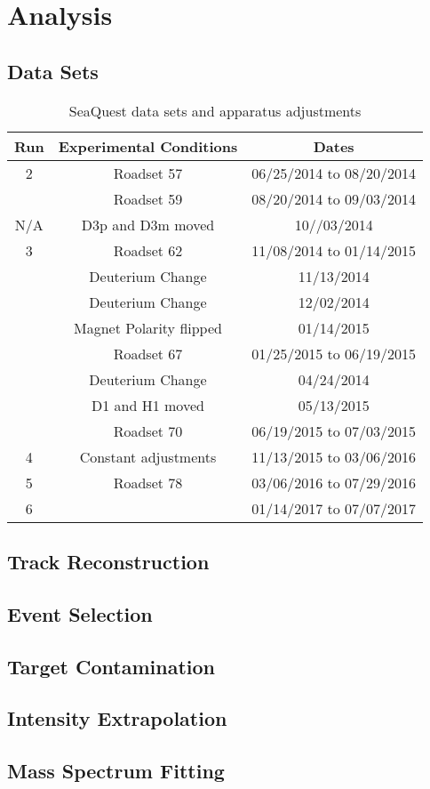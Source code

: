 \documentclass[../main.tex]{subfiles}
\begin{document}
\ifSubfilesClassLoaded{\mainmatter}{}

\chapter{Analysis}
\label{ch:analysis}

\section{Data Sets}

\begin{table}[h!]
	\centering
	\begin{tabular}{ c c c }
		\hline
		Run & Experimental Conditions & Dates\\
		\hline
		2   & Roadset 57 & 06/25/2014 to 08/20/2014\\
		    & Roadset 59 & 08/20/2014 to 09/03/2014\\
		\hline
		N/A & D3p and D3m moved & 10//03/2014\\
		\hline
		3   & Roadset 62 & 11/08/2014 to 01/14/2015\\
		    & Deuterium Change & 11/13/2014\\
		    & Deuterium Change & 12/02/2014\\
		    & Magnet Polarity flipped & 01/14/2015\\
		    & Roadset 67 & 01/25/2015 to 06/19/2015\\
		    & Deuterium Change & 04/24/2014\\
		    & D1 and H1 moved & 05/13/2015\\
		    & Roadset 70 & 06/19/2015 to 07/03/2015\\
		\hline
		4   & Constant adjustments & 11/13/2015 to 03/06/2016\\
		5   & Roadset 78 & 03/06/2016 to 07/29/2016\\
		6   &   & 01/14/2017 to 07/07/2017\\
	\end{tabular}
	\caption{SeaQuest data sets and apparatus adjustments}
	\label{tab:dataset}
\end{table}


\section{Track Reconstruction}

\section{Event Selection}

\section{Target Contamination}

\section{Intensity Extrapolation}

\section{Mass Spectrum Fitting}

\ifSubfilesClassLoaded{ \printbibliography[heading=bibintoc,title={References}]}{}
\end{document}
